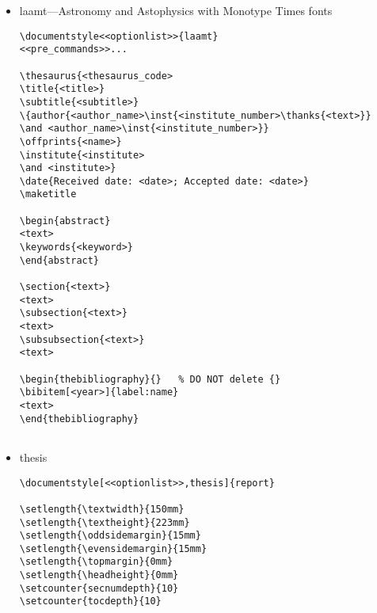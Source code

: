 \begin{itemize}
\begin{small}
\begin{verbatim}
\end{verbatim}
\end{small}

\item laamt---Astronomy and Astophysics with Monotype Times fonts

\begin{small}
\begin{verbatim}
\documentstyle<<optionlist>>{laamt}
<<pre_commands>>...

\thesaurus{<thesaurus_code>
\title{<title>}
\subtitle{<subtitle>}
\{author{<author_name>\inst{<institute_number>\thanks{<text>}}
\and <author_name>\inst{<institute_number>}}
\offprints{<name>}
\institute{<institute>
\and <institute>}
\date{Received date: <date>; Accepted date: <date>}
\maketitle

\begin{abstract}
<text>
\keywords{<keyword>}
\end{abstract}

\section{<text>}
<text>
\subsection{<text>}
<text>
\subsubsection{<text>}
<text>

\begin{thebibliography}{}	% DO NOT delete {}
\bibitem[<year>]{label:name}
<text>
\end{thebibliography}


\end{verbatim}
\end{small}

\item thesis

\begin{small}
\begin{verbatim}
\documentstyle[<<optionlist>>,thesis]{report}

\setlength{\textwidth}{150mm}
\setlength{\textheight}{223mm}
\setlength{\oddsidemargin}{15mm}
\setlength{\evensidemargin}{15mm}
\setlength{\topmargin}{0mm}
\setlength{\headheight}{0mm}
\setcounter{secnumdepth}{10}
\setcounter{tocdepth}{10}


\end{verbatim}
\end{small}
\end{itemize}
